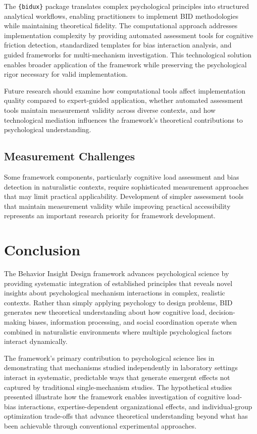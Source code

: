 \documentclass[
  authoryear,
  preprint]{elsarticle}
\begin{document}
The \texttt{\{bidux\}} package translates complex psychological
principles into structured analytical workflows, enabling practitioners
to implement BID methodologies while maintaining theoretical fidelity.
The computational approach addresses implementation complexity by
providing automated assessment tools for cognitive friction detection,
standardized templates for bias interaction analysis, and guided
frameworks for multi-mechanism investigation. This technological
solution enables broader application of the framework while preserving
the psychological rigor necessary for valid implementation.

Future research should examine how computational tools affect
implementation quality compared to expert-guided application, whether
automated assessment tools maintain measurement validity across diverse
contexts, and how technological mediation influences the framework's
theoretical contributions to psychological understanding.

\subsection{Measurement Challenges}\label{measurement-challenges}

Some framework components, particularly cognitive load assessment and
bias detection in naturalistic contexts, require sophisticated
measurement approaches that may limit practical applicability.
Development of simpler assessment tools that maintain measurement
validity while improving practical accessibility represents an important
research priority for framework development.

\section{Conclusion}\label{conclusion}

The Behavior Insight Design framework advances psychological science by
providing systematic integration of established principles that reveals
novel insights about psychological mechanism interactions in complex,
realistic contexts. Rather than simply applying psychology to design
problems, BID generates new theoretical understanding about how
cognitive load, decision-making biases, information processing, and
social coordination operate when combined in naturalistic environments
where multiple psychological factors interact dynamically.

The framework's primary contribution to psychological science lies in
demonstrating that mechanisms studied independently in laboratory
settings interact in systematic, predictable ways that generate emergent
effects not captured by traditional single-mechanism studies. The
hypothetical studies presented illustrate how the framework enables
investigation of cognitive load-bias interactions, expertise-dependent
organizational effects, and individual-group optimization trade-offs
that advance theoretical understanding beyond what has been achievable
through conventional experimental approaches.
\end{document}
